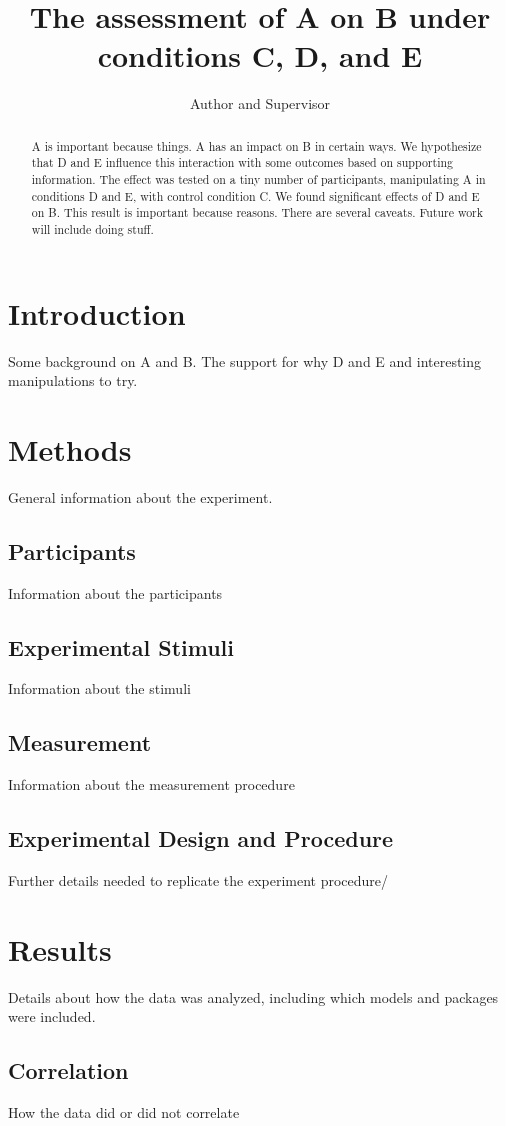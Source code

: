 \documentclass[a4paper,11pt]{article}
\title{The assessment of A on B under conditions C, D, and E}
\author{Author and Supervisor}
\begin{document}
\maketitle
\tableofcontents

\begin{abstract}
A is important because things. 
A has an impact on B in certain ways.
We hypothesize that D and E influence this interaction with some outcomes based on supporting information. 
The effect was tested on a tiny number of participants, manipulating A in conditions D and E, with control condition C.
We found significant effects of D and E on B.
This result is important because reasons.
There are several caveats.
Future work will include doing stuff.
\end{abstract}
\newpage
\section{Introduction}
Some background on A and B.
The support for why D and E and interesting manipulations to try.
\section{Methods}
General information about the experiment.
\subsection{Participants}
Information about the participants
\subsection{Experimental Stimuli}
Information about the stimuli
\subsection{Measurement}
Information about the measurement procedure
\subsection{Experimental Design and Procedure}
Further details needed to replicate the experiment procedure/

\section{Results}
Details about how the data was analyzed, including which models and packages were included.
\subsection{Correlation}
How the data did or did not correlate
\end{document}
